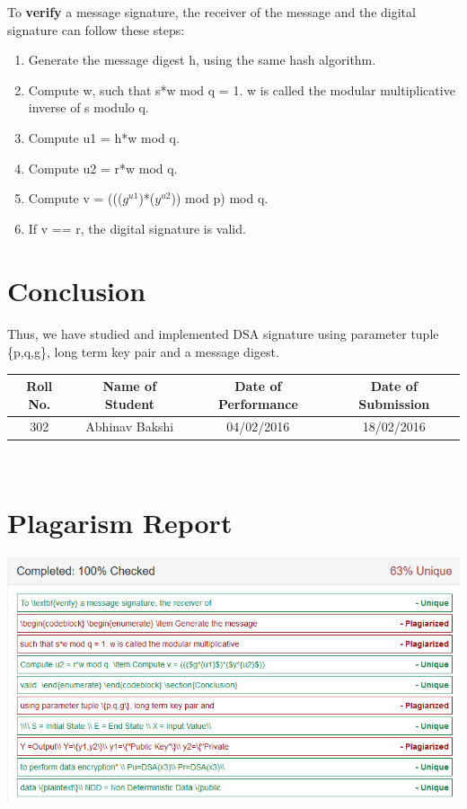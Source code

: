 \documentclass[a4paper,12pt]{article}
\newenvironment{codeblock}{\fontfamily{pcr}\selectfont}{\par}
\begin{document}
To \textbf{verify} a message signature, the receiver of the message and the digital signature can follow these steps: 
	\begin{codeblock}
    \begin{enumerate}	
    	\item Generate the message digest h, using the same hash algorithm.
    	\item Compute w, such that s*w mod q = 1. w is called the modular multiplicative inverse of s modulo q.
    	\item Compute u1 = h*w mod q.
    	\item Compute u2 = r*w mod q.
    	\item Compute v = ((($g^{u1}$)*($y^{u2}$)) mod p) mod q.
    	\item If v == r, the digital signature is valid.
	\end{enumerate}
    \end{codeblock}
    
\section{Conclusion}
	\paragraph{} Thus, we have studied and implemented  DSA signature using parameter tuple \{p,q,g\}, long term key pair and a message digest.
	
\vspace{20px}
\begin{center}
	\begin{tabular}
		{|c|c|c|c|}\hline
		{\bf Roll No.}		&{\bf Name of Student}		&{\bf Date of Performance}  				&{\bf Date of Submission}  \\ \hline
		{302}	&	{Abhinav Bakshi}& {04/02/2016}	&  {18/02/2016} \\ \hline
	\end{tabular}\\ 
\end{center}

\section{Plagarism Report}
  \includegraphics[width=\textwidth]{dsapl}
\end{document}
